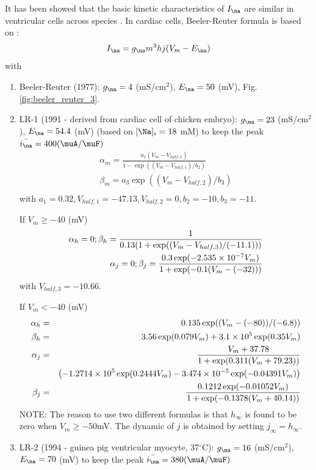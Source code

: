 It has been showed that the basic kinetic characteristics of $I_\na$ are similar
in ventricular cells across species \citep{hanck1995}. In cardiac cells,
Beeler-Reuter formula is based on \citep{haas1971}:
\begin{equation}
I_\na = g_\na m^3 h j (V_m-E_\na)
\end{equation}
with
\begin{enumerate}
  \item Beeler-Reuter (1977): $g_\na= 4$ (mS/cm$^2$), $E_\na = 50$ (mV),
  Fig.\ref{fig:beeler_reuter_3}.
  
  \item LR-1 (1991 - derived from cardiac cell of chicken embryo): $g_\na=23$
  (mS/cm$^2$), $E_\na=54.4$ (mV) (based on $[\Na]_i=18$ mM) to keep the peak
  $\bar{i_\na}=400 (\muA/\muF)$ 
  \begin{eqnarray}
  \alpha_m = \frac{a_1 (V_m - V_{half,1} )}{1-\exp((V_m - V_{half,1})/b_2)} \\
  \beta_m = a_3 \exp((V_m-V_{half,2})/b_3) \\
  \end{eqnarray}
  with $a_1=0.32, V_{half,1}=-47.13, V_{half,2} = 0, b_2=-10, b_3=-11$.
  
  If $V_m \ge -40$ (mV)
  \begin{eqnarray}
  \alpha_h = 0 ;   \beta_h = \frac{1}{0.13(1+\exp((V_m - V_{half,3})/(-11.1)))}
  \\
  \alpha_j = 0 ;   \beta_j = \frac{0.3\exp(-2.535\times 10^{-7} V_m)}{1+\exp(-0.1(V_m -
  (-32)))}
  \end{eqnarray}
  with $V_{half,3}=-10.66$.
  
  If $V_m < -40$ (mV)
  \begin{eqnarray*}
  \alpha_h = && 0.135 \exp((V_m-(-80))/(-6.8)) \\
  \beta_h = &&3.56 \exp(0.079 V_m) + 3.1\times 10^{5} \exp(0.35 V_m) \\
  \alpha_j = &&\frac{V_m+37.78}{1+\exp(0.311(V_m+79.23))} \\
       &&\left(-1.2714\times 10^{5} \exp(0.2444V_m) - 3.474\times 10^{-5} \exp(-0.04391 V_m)
       \right)
  \\
  \beta_j = &&\frac{0.1212 \exp(-0.01052 V_m)}{1+ \exp(-0.1378(V_m+40.14))}
  \end{eqnarray*}
  NOTE: The reason to use two different formulas is that $h_\infty$ is found to
  be zero when $V_m \ge -50 $mV. The dynamic of $j$ is obtained by setting
  $j_\infty = h_\infty$.
  
  \item LR-2 (1994 - guinea pig ventricular myocyte, 37$^\circ$C): $g_\na=16$
  (mS/cm$^2$), $E_\na=70$ (mV) to keep the peak $\bar{i_\na}=380 (\muA/\muF)$
  

\end{enumerate}
